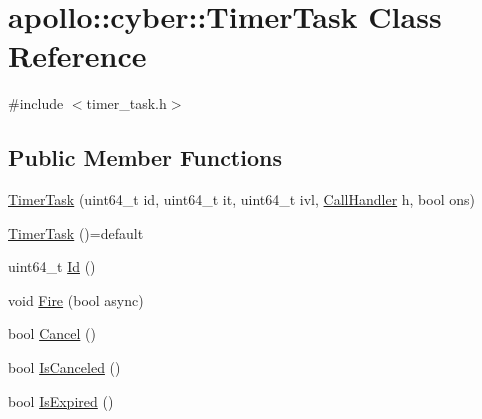 \hypertarget{classapollo_1_1cyber_1_1TimerTask}{\section{apollo\-:\-:cyber\-:\-:Timer\-Task Class Reference}
\label{classapollo_1_1cyber_1_1TimerTask}
}


{\ttfamily \#include $<$timer\-\_\-task.\-h$>$}

\subsection*{Public Member Functions}
\begin{DoxyCompactItemize}
\item 
\hyperlink{classapollo_1_1cyber_1_1TimerTask_a47c9483a816dc0975777d6ab584778b4}{Timer\-Task} (uint64\-\_\-t id, uint64\-\_\-t it, uint64\-\_\-t ivl, \hyperlink{namespaceapollo_1_1cyber_a73f7b365c4d923725c0a03bfb8c97978}{Call\-Handler} h, bool ons)
\item 
\hyperlink{classapollo_1_1cyber_1_1TimerTask_a5ffb99c2d598df3f991fb5b0852b65c4}{Timer\-Task} ()=default
\item 
uint64\-\_\-t \hyperlink{classapollo_1_1cyber_1_1TimerTask_a20ddd9c2160d756b939ae0e7fe1b07bd}{Id} ()
\item 
void \hyperlink{classapollo_1_1cyber_1_1TimerTask_a989cc4900a9d303fd2a62d6b3d3ca4bf}{Fire} (bool async)
\item 
bool \hyperlink{classapollo_1_1cyber_1_1TimerTask_ab8042523f5416d5383d6b25c1f624aba}{Cancel} ()
\item 
bool \hyperlink{classapollo_1_1cyber_1_1TimerTask_a6badb4f167ade19b6b0ddc9df15dd708}{Is\-Canceled} ()
\item 
bool \hyperlink{classapollo_1_1cyber_1_1TimerTask_a37551d4fbbe37ea9c3a5d9770d68f7b9}{Is\-Expired} ()
\end{DoxyCompactItemize}
